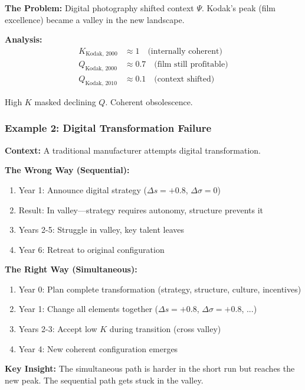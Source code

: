 \textbf{The Problem:} Digital photography shifted context $\Psi$. Kodak's peak (film excellence) became a valley in the new landscape.

\textbf{Analysis:}
\begin{align}
K_{\text{Kodak, 2000}} &\approx 1 \quad \text{(internally coherent)} \\
Q_{\text{Kodak, 2000}} &\approx 0.7 \quad \text{(film still profitable)} \\
Q_{\text{Kodak, 2010}} &\approx 0.1 \quad \text{(context shifted)}
\end{align}

High $K$ masked declining $Q$. Coherent obsolescence.

\subsubsection{Example 2: Digital Transformation Failure}

\textbf{Context:} A traditional manufacturer attempts digital transformation.

\textbf{The Wrong Way (Sequential):}
\begin{enumerate}
\item Year 1: Announce digital strategy ($\Delta s = +0.8$, $\Delta \sigma = 0$)
\item Result: In valley---strategy requires autonomy, structure prevents it
\item Years 2-5: Struggle in valley, key talent leaves
\item Year 6: Retreat to original configuration
\end{enumerate}

\textbf{The Right Way (Simultaneous):}
\begin{enumerate}
\item Year 0: Plan complete transformation (strategy, structure, culture, incentives)
\item Year 1: Change all elements together ($\Delta s = +0.8$, $\Delta \sigma = +0.8$, ...)
\item Years 2-3: Accept low $K$ during transition (cross valley)
\item Year 4: New coherent configuration emerges
\end{enumerate}

\textbf{Key Insight:} The simultaneous path is harder in the short run but reaches the new peak. The sequential path gets stuck in the valley.


